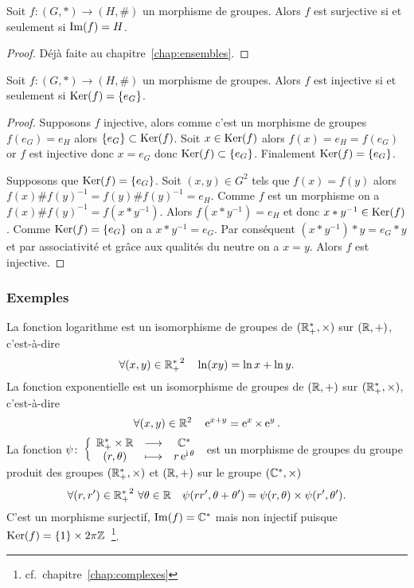 \begin{prop}
  Soit \(f:(G,*) \longrightarrow (H,\#)\) un morphisme de groupes. Alors \(f\)
  est surjective si et seulement si \(\operatorname{Im}(f)=H\).
\end{prop}
\begin{proof}
  Déjà faite au chapitre~\ref{chap:ensembles}.
\end{proof}
\begin{prop}
  Soit \(f:(G,*) \longrightarrow (H,\#)\) un morphisme de groupes. Alors \(f\)
  est injective si et seulement si \(\operatorname{Ker}(f)=\{e_G\}\).
\end{prop}
\begin{proof}
  Supposons \(f\) injective, alors comme c'est un morphisme de groupes
  \(f(e_G)=e_H\) alors \(\{e_G\} \subset \operatorname{Ker}(f)\). Soit \(x \in \operatorname{Ker}(f)\) alors
  \(f(x)=e_H=f(e_G)\) or \(f\) est injective donc \(x=e_G\) donc \(\operatorname{Ker}(f)
  \subset \{e_G\}\). Finalement \(\operatorname{Ker}(f)=\{e_G\}\).

  Supposons que \(\operatorname{Ker}(f)=\{e_G\}\). Soit \((x,y) \in G^2\) tels que
  \(f(x)=f(y)\) alors \(f(x)\#f(y)^{-1}=f(y)\#f(y)^{-1} = e_H\). Comme \(f\) est
  un morphisme on a \(f(x)\#f(y)^{-1} = f(x*y^{-1})\). Alors \(f(x*y^{-1}) =
  e_H\) et donc \(x*y^{-1} \in \operatorname{Ker}(f)\). Comme \(\operatorname{Ker}(f)=\{e_G\}\) on a
  \(x*y^{-1} = e_G\). Par conséquent \((x*y^{-1})*y = e_G*y\) et par
  associativité et grâce aux qualités du neutre on a \(x=y\). Alors \(f\) est
  injective.
\end{proof}

\subsubsection{Exemples}

La fonction logarithme est un isomorphisme de groupes de \((\mathbb{R}^{*}_+,\times)\)
sur \((\mathbb{R},+)\), c'est-à-dire
\begin{equation}
  \forall (x,y) \in {\mathbb{R}_{+}^{*}}^2 \quad \ln(xy) = \ln x + \ln y.
\end{equation}
La fonction exponentielle est un isomorphisme de groupes de \((\mathbb{R},+)\) sur
\((\mathbb{R}^{*}_+,\times)\), c'est-à-dire
\begin{equation}
  \forall (x,y) \in \mathbb{R}^2 \quad \operatorname{e}^{x+y} = \operatorname{e}^x \times \operatorname{e}^y.
\end{equation}
La fonction \(\psi\colon\left\{\begin{array}{ccc}\mathbb{R}_{+}^{*} \times
\mathbb{R} & \longrightarrow &\mathbb{C}^{*}\\(r,\theta) & \longmapsto & r\operatorname{e}^{\operatorname{i} \theta}\end{array}\right.\) est un morphisme de groupes du
groupe produit des groupes \((\mathbb{R}_{+}^{*},\times)\) et \((\mathbb{R},+)\) sur le groupe
\((\mathbb{C}^{*},\times)\)
\begin{equation}
  \forall (r,r') \in {\mathbb{R}_{+}^{*}}^2 \ \forall \theta \in \mathbb{R} \quad
  \psi(rr',\theta+\theta')=\psi(r,\theta) \times \psi(r',\theta').
\end{equation}
C'est un morphisme surjectif, \(\operatorname{Im}(f)=\mathbb{C}^{*}\) mais non injectif puisque
\(\operatorname{Ker}(f)=\{1\}\times 2\pi \mathbb{Z}\)~\footnote{cf.\ chapitre~\ref{chap:complexes}}.

